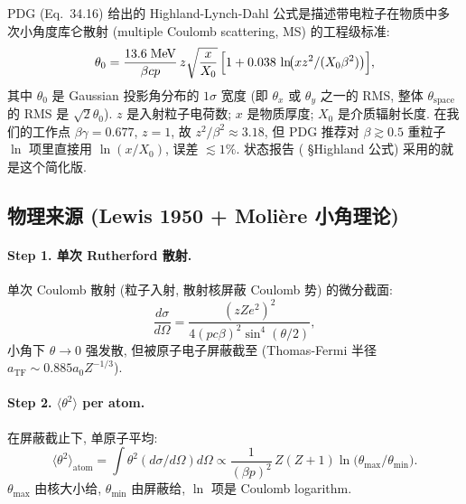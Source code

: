 PDG (Eq.~34.16) 给出的 Highland-Lynch-Dahl 公式是描述带电粒子在物质中多次小角度库仑散射 (multiple Coulomb scattering, MS) 的工程级标准:
\begin{equation}
  \theta_0 = \frac{13.6\;\mathrm{MeV}}{\beta c p}\, z
  \sqrt{\frac{x}{X_0}}\,
  \Bigl[1 + 0.038\,\ln\!\bigl(x z^2 / (X_0 \beta^2)\bigr)\Bigr],
  \label{eq:partIc:highland_master}
\end{equation}
其中 $\theta_0$ 是 Gaussian 投影角分布的 $1\sigma$ 宽度 (即 $\theta_x$ 或 $\theta_y$ 之一的 RMS, 整体 $\theta_\mathrm{space}$ 的 RMS 是 $\sqrt 2 \theta_0$). $z$ 是入射粒子电荷数; $x$ 是物质厚度; $X_0$ 是介质辐射长度. 在我们的工作点 $\beta\gamma = 0.677$, $z=1$, 故 $z^2/\beta^2 \approx 3.18$, 但 PDG 推荐对 $\beta \gtrsim 0.5$ 重粒子 $\ln$ 项里直接用 $\ln(x/X_0)$, 误差 $\lesssim 1\%$. 状态报告 (\StatusReport{} §Highland 公式) 采用的就是这个简化版.

\subsection{物理来源 (Lewis 1950 + Molière 小角理论)}

\paragraph{Step 1. 单次 Rutherford 散射.} 单次 Coulomb 散射 (粒子入射, 散射核屏蔽 Coulomb 势) 的微分截面:
\begin{equation}
  \frac{d\sigma}{d\Omega} = \frac{(z Z e^2)^2}{4 (p c \beta)^2 \sin^4(\theta/2)},
\end{equation}
小角下 $\theta \to 0$ 强发散, 但被原子电子屏蔽截至 (Thomas-Fermi 半径 $a_\mathrm{TF} \sim 0.885 a_0 Z^{-1/3}$).

\paragraph{Step 2. $\langle \theta^2 \rangle$ per atom.} 在屏蔽截止下, 单原子平均:
\begin{equation}
  \langle \theta^2 \rangle_\mathrm{atom}
  = \int \theta^2 (d\sigma/d\Omega) d\Omega
  \propto \frac{1}{(\beta p)^2}\, Z(Z+1) \ln\!\bigl(\theta_\mathrm{max}/\theta_\mathrm{min}\bigr).
\end{equation}
$\theta_\mathrm{max}$ 由核大小给, $\theta_\mathrm{min}$ 由屏蔽给, $\ln$ 项是 Coulomb logarithm.

